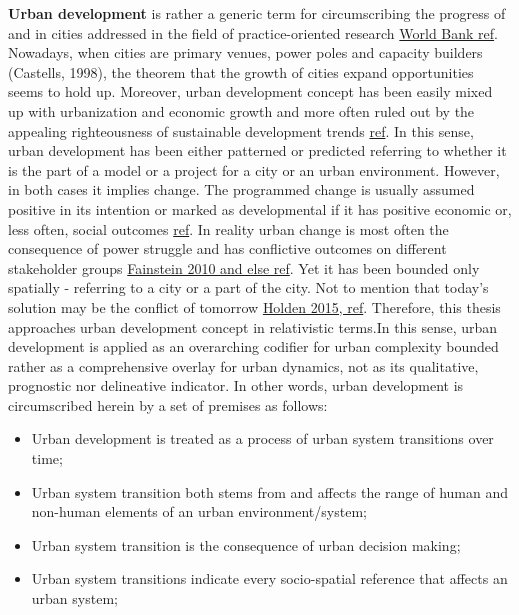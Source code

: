 \documentclass[11pt]{report}
\begin{document}
\textbf{Urban development} is rather a generic term for circumscribing the progress of and in cities addressed in the  field of practice-oriented research \href{ref}{World Bank ref}. Nowadays, when cities are primary venues, power poles and capacity builders (Castells, 1998), the theorem that the growth of cities expand opportunities seems to hold up. Moreover, urban development concept has been easily mixed up with urbanization and economic growth and more often ruled out by the appealing righteousness of sustainable development trends \href{ref}{ref}.  In this sense, urban development has been either patterned or predicted referring to whether it is the part of a model or a project for a city or an urban environment. However, in both cases it implies change. The programmed change is usually assumed positive in its intention or marked as developmental if it has positive economic or, less often, social outcomes \href{ref}{ref}. In reality urban change is most often the consequence of power struggle and has conflictive outcomes on different stakeholder groups \href{ref}{Fainstein 2010 and else ref}. Yet it has been bounded only spatially - referring to a city or a part of the city. Not to mention that today's solution may be the conflict of tomorrow \href{ref}{Holden 2015, ref}.
Therefore, this thesis approaches urban development concept in relativistic terms.\footnotemark In this sense, urban development is applied as an overarching codifier for urban complexity bounded rather as a comprehensive overlay for urban dynamics, not as its qualitative, prognostic nor delineative indicator. In other words,  urban development is circumscribed herein by a set of premises as follows:
\begin{itemize}
\item Urban development is treated as a process of urban system transitions over time;
\item Urban system transition both stems from and affects the range of human and non-human elements of an urban environment/system;
\item Urban system transition is the consequence of urban decision making;
\item Urban system transitions indicate every socio-spatial reference that affects an urban system;
\end {itemize}
\end{document}
